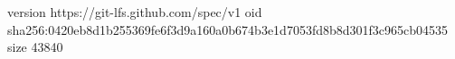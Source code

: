 version https://git-lfs.github.com/spec/v1
oid sha256:0420eb8d1b255369fe6f3d9a160a0b674b3e1d7053fd8b8d301f3c965cb04535
size 43840
